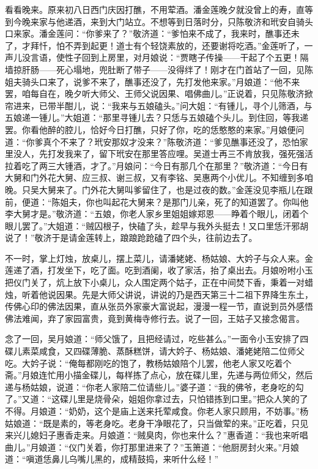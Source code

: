 看看晚来。原来初八日西门庆因打醮，不用荤酒。潘金莲晚夕就没曾上的寿，直等到今晚来家与他递酒，来到大门站立。不想等到日落时分，只陈敬济和玳安自骑头口来家。潘金莲问：“你爹来了？”敬济道：“爹怕来不成了，我来时，醮事还未了，才拜忏，怕不弄到起更！道士有个轻饶素放的，还要谢将吃酒。”金莲听了，一声儿没言语，使性子回到上房里，对月娘说：“贾瞎子传操——干起了个五更！隔墙掠肝肠——死心塌地，兜肚断了带子——没得绊了！刚才在门首站了一回，见陈姐夫骑头口来了，说爹不来了，醮事还没了，先打发他来家。”月娘道：“他不来罢，咱每自在，晚夕听大师父、王师父说因果、唱佛曲儿。”正说着，只见陈敬济掀帘进来，已带半酣儿，说：“我来与五娘磕头。”问大姐：“有锺儿，寻个儿筛酒，与五娘递一锺儿。”大姐道：“那里寻锺儿去？只恁与五娘磕个头儿。到住回，等我递罢。你看他醉的腔儿，恰好今日打醮，只好了你，吃的恁憨憨的来家。”月娘便问道：“你爹真个不来了？玳安那奴才没来？”陈敬济道：“爹见醮事还没了，恐怕家里没人，先打发我来了，留下玳安在那里答应哩。吴道士再三不肯放我，强死强活拉着吃了两三大锺酒，才了。”月娘问：“今日有那几个在那里？”敬济道：“今日有大舅和门外花大舅、应三叔、谢三叔，又有李铭、吴惠两个小优儿。不知缠到多咱晚。只吴大舅来了。门外花大舅叫爹留住了，也是过夜的数。”金莲没见李瓶儿在跟前，便道：“陈姐夫，你也叫起花大舅来？是那门儿亲，死了的知道罢了。你叫他李大舅才是。”敬济道：“五娘，你老人家乡里姐姐嫁郑恩——睁着个眼儿，闭着个眼儿罢了。”大姐道：“贼囚根子，快磕了头，趁早与我外头挺去！又口里恁汗邪胡说了！”敬济于是请金莲转上，踉踉跄跄磕了四个头，往前边去了。

不一时，掌上灯烛，放桌儿，摆上菜儿，请潘姥姥、杨姑娘、大妗子与众人来。金莲递了酒，打发坐下，吃了面。吃到酒阑，收了家活，抬了桌出去。月娘吩咐小玉把仪门关了，炕上放下小桌儿，众人围定两个姑子，正在中间焚下香，秉着一对蜡烛，听着他说因果。先是大师父讲说，讲说的乃是西天第三十二祖下界降生东土，传佛心印的佛法因果，直从张员外家豪大富说起，漫漫一程一节，直说到员外感悟佛法难闻，弃了家园富贵，竟到黄梅寺修行去。说了一回，王姑子又接念偈言。

念了一回，吴月娘道：“师父饿了，且把经请过，吃些甚么。”一面令小玉安排了四碟儿素菜咸食，又四碟薄脆、蒸酥糕饼，请大妗子、杨姑娘、潘姥姥陪二位师父吃。大妗子说：“俺每都刚吃的饱了，教杨姑娘陪个儿罢，他老人家又吃着个斋。”月娘连忙用小描金碟儿，每样拣了点心，放在碟儿里，先递与两位师父，然后递与杨姑娘，说道：“你老人家陪二位请些儿。”婆子道：“我的佛爷，老身吃的勾了。”又道：“这碟儿里是烧骨朵，姐姐你拿过去，只怕错拣到口里。”把众人笑的了不得。月娘道：“奶奶，这个是庙上送来托荤咸食。你老人家只顾用，不妨事。”杨姑娘道：“既是素的，等老身吃。老身干净眼花了，只当做荤的来。”正吃着，只见来兴儿媳妇子惠香走来。月娘道：“贼臭肉，你也来什么？”惠香道：“我也来听唱曲儿。”月娘道：“仪门关着，你打那里进来了？”玉箫道：“他厨房封火来。”月娘道：“嗔道恁鼻儿乌嘴儿黑的，成精鼓捣，来听什么经！”

